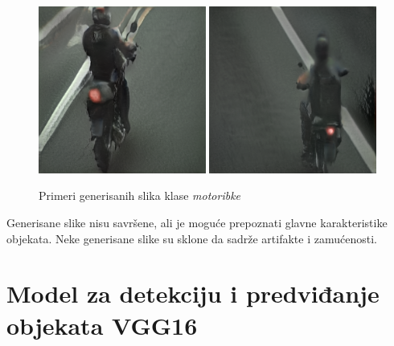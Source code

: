 \documentclass[12pt,oneside]{memoir}
\begin{document}
\begin{figure}[!htbp]
\centering
    \includegraphics[width=0.49\textwidth]{matfmaster/stylegan/motorbike/image2.png}
    \includegraphics[width=0.49\textwidth]{matfmaster/stylegan/motorbike/image9.png}
\caption{Primeri generisanih slika klase \textit{motoribke}}
\label{fig:section4_stylegan_motorbike_images}
\end{figure}

Generisane slike nisu savršene, ali je moguće prepoznati glavne karakteristike objekata. Neke generisane slike su sklone da sadrže artifakte i zamućenosti.%


\section{Model za detekciju i predviđanje objekata VGG16}
\end{document}
